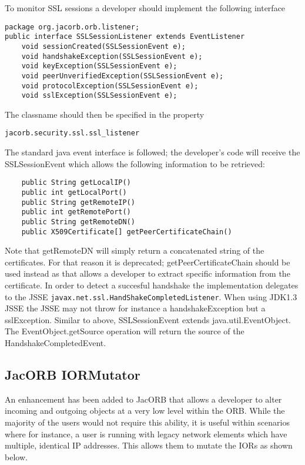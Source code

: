 {{To monitor SSL sessions a developer should implement the following interface
\begin{small}
\begin{verbatim}
package org.jacorb.orb.listener;
public interface SSLSessionListener extends EventListener
    void sessionCreated(SSLSessionEvent e);
    void handshakeException(SSLSessionEvent e);
    void keyException(SSLSessionEvent e);
    void peerUnverifiedException(SSLSessionEvent e);
    void protocolException(SSLSessionEvent e);
    void sslException(SSLSessionEvent e);
\end{verbatim}
\end{small}
The classname should then be specified in the property
\begin{verbatim}
jacorb.security.ssl.ssl_listener
\end{verbatim}

The standard java event interface is followed; the developer's code will receive the
SSLSessionEvent which allows the following information to be retrieved:
\begin{small}
\begin{verbatim}
    public String getLocalIP()
    public int getLocalPort()
    public String getRemoteIP()
    public int getRemotePort()
    public String getRemoteDN()
    public X509Certificate[] getPeerCertificateChain()
\end{verbatim}
\end{small}

Note that getRemoteDN will simply return a concatenated string of the
certificates. For that reason it is deprecated; getPeerCertificateChain should
be used instead as that allows a developer to extract specific information from
the certificate.  In order to detect a succesful handshake the implementation
delegates to the JSSE {\tt javax.net.ssl.HandShakeCompletedListener}. When using
JDK1.3 JSSE the JSSE may not throw for instance a handshakeException but a
sslException. Similar to above, SSLSessionEvent extends java.util.EventObject. The
EventObject.getSource operation will return the source of the HandshakeCompletedEvent.

\subsection{JacORB IORMutator}
\label{eventLogging}

An enhancement has been added to JacORB that allows a developer to alter incoming
and outgoing objects at a very low level within the ORB. While the majority of the
users would not require this ability, it is useful within scenarios where for instance,
a user is running with legacy network elements which have multiple, identical IP
addresses. This allows them to mutate the IORs as shown below.

}}
